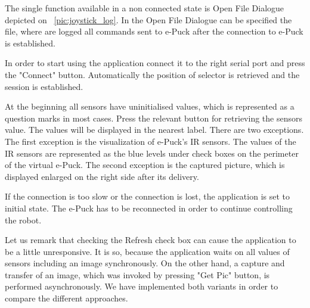   The single function available in a non connected state
  is Open File Dialogue depicted on ~\ref{pic:joystick_log}.
  In the  Open File Dialogue can be specified the file, 
  where are logged all commands sent to e-Puck after the connection
  to e-Puck is established.

  In order to start using the application connect it to the right serial port and press the "Connect" button.
  Automatically the position of selector is retrieved and the session is established.

  At the beginning all sensors have uninitialised values, 
  which is represented as a question marks in most cases.
  Press the relevant button for retrieving the sensors value. 
  The values will be displayed in the nearest label.
  There are two exceptions. The first exception is the visualization of e-Puck's IR sensors. 
  The values of the IR sensors
  are represented as the blue levels under check boxes on 
  the perimeter of the virtual e-Puck.
  The second  exception is the captured picture, which is displayed enlarged on the right side after its delivery.

  If the connection is too slow or the connection is lost, the application
  is set to initial state. The e-Puck has to be reconnected 
  in order to continue controlling the robot.

  Let us remark that checking the Refresh check box can 
  cause the application to be a little unresponsive.	
  It is so, because the application waits on all values of sensors including an image synchronously.
  On the other hand, a capture and transfer of an image, 
  which was invoked by pressing "Get Pic" button, is performed asynchronously. 
  We have implemented both variants in order to compare the different approaches.

